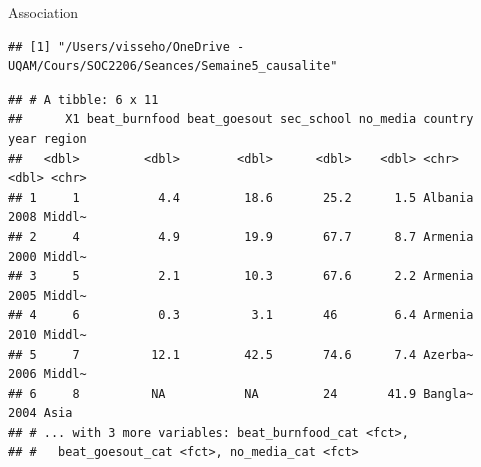 \documentclass[ignorenonframetext,]{beamer}
\begin{document}
\begin{frame}[fragile]{Association}
\protect\hypertarget{association-2}{}

\begin{verbatim}
## [1] "/Users/visseho/OneDrive - UQAM/Cours/SOC2206/Seances/Semaine5_causalite"
\end{verbatim}

\begin{verbatim}
## # A tibble: 6 x 11
##      X1 beat_burnfood beat_goesout sec_school no_media country  year region
##   <dbl>         <dbl>        <dbl>      <dbl>    <dbl> <chr>   <dbl> <chr> 
## 1     1           4.4         18.6       25.2      1.5 Albania  2008 Middl~
## 2     4           4.9         19.9       67.7      8.7 Armenia  2000 Middl~
## 3     5           2.1         10.3       67.6      2.2 Armenia  2005 Middl~
## 4     6           0.3          3.1       46        6.4 Armenia  2010 Middl~
## 5     7          12.1         42.5       74.6      7.4 Azerba~  2006 Middl~
## 6     8          NA           NA         24       41.9 Bangla~  2004 Asia  
## # ... with 3 more variables: beat_burnfood_cat <fct>,
## #   beat_goesout_cat <fct>, no_media_cat <fct>
\end{verbatim}

\end{frame}
\end{document}
